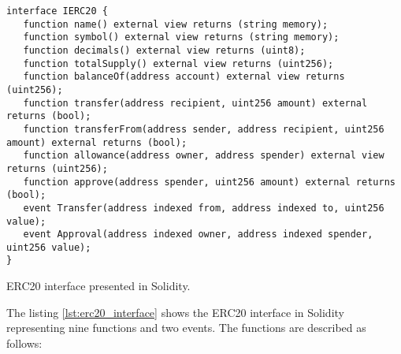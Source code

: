 \begin{listing}[!ht]
   \begin{verbatim}
interface IERC20 {
   function name() external view returns (string memory);
   function symbol() external view returns (string memory);
   function decimals() external view returns (uint8);
   function totalSupply() external view returns (uint256);
   function balanceOf(address account) external view returns (uint256);
   function transfer(address recipient, uint256 amount) external returns (bool);
   function transferFrom(address sender, address recipient, uint256 amount) external returns (bool);
   function allowance(address owner, address spender) external view returns (uint256);
   function approve(address spender, uint256 amount) external returns (bool);
   event Transfer(address indexed from, address indexed to, uint256 value);
   event Approval(address indexed owner, address indexed spender, uint256 value);
}
   \end{verbatim}
   \caption{ERC20 interface presented in Solidity.}
   \label{lst:erc20_interface}
\end{listing}


The listing \ref{lst:erc20_interface} shows the ERC20 interface in Solidity representing nine functions and two events. The functions are described as follows:


